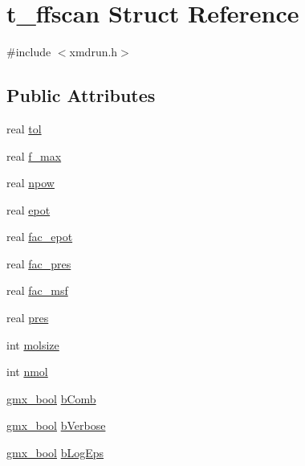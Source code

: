 \hypertarget{structt__ffscan}{\section{t\-\_\-ffscan \-Struct \-Reference}
\label{structt__ffscan}
}


{\ttfamily \#include $<$xmdrun.\-h$>$}

\subsection*{\-Public \-Attributes}
\begin{DoxyCompactItemize}
\item 
real \hyperlink{structt__ffscan_a7e63dc2b200c3dae417040b64b80a8a3}{tol}
\item 
real \hyperlink{structt__ffscan_a483784f12c3d517bb4541f60edf55f96}{f\-\_\-max}
\item 
real \hyperlink{structt__ffscan_a2e6684200b75925126be6711f0e224a4}{npow}
\item 
real \hyperlink{structt__ffscan_a08ce813c4a5e6a93a0e6f82204537004}{epot}
\item 
real \hyperlink{structt__ffscan_a104a54c403bc495e2c2157c23cea3122}{fac\-\_\-epot}
\item 
real \hyperlink{structt__ffscan_afb82f630afc15f1fd352569e67b92b27}{fac\-\_\-pres}
\item 
real \hyperlink{structt__ffscan_ac6739cc5feaa7c54214b111d578ae0c6}{fac\-\_\-msf}
\item 
real \hyperlink{structt__ffscan_a5a645b900d4e48d62bb2d621d2feba0b}{pres}
\item 
int \hyperlink{structt__ffscan_a3d118bf428332360ab69573b0b8979ed}{molsize}
\item 
int \hyperlink{structt__ffscan_a44b87841de5cff9ee74b4bb22f10f7a7}{nmol}
\item 
\hyperlink{include_2types_2simple_8h_a8fddad319f226e856400d190198d5151}{gmx\-\_\-bool} \hyperlink{structt__ffscan_ada11744647131608d024bce2e994cfbe}{b\-Comb}
\item 
\hyperlink{include_2types_2simple_8h_a8fddad319f226e856400d190198d5151}{gmx\-\_\-bool} \hyperlink{structt__ffscan_abeb6fec4f45e4fd21194cc61ec4845e4}{b\-Verbose}
\item 
\hyperlink{include_2types_2simple_8h_a8fddad319f226e856400d190198d5151}{gmx\-\_\-bool} \hyperlink{structt__ffscan_a3a6f9d4795dbd6305709048ca62528be}{b\-Log\-Eps}
\end{DoxyCompactItemize}


